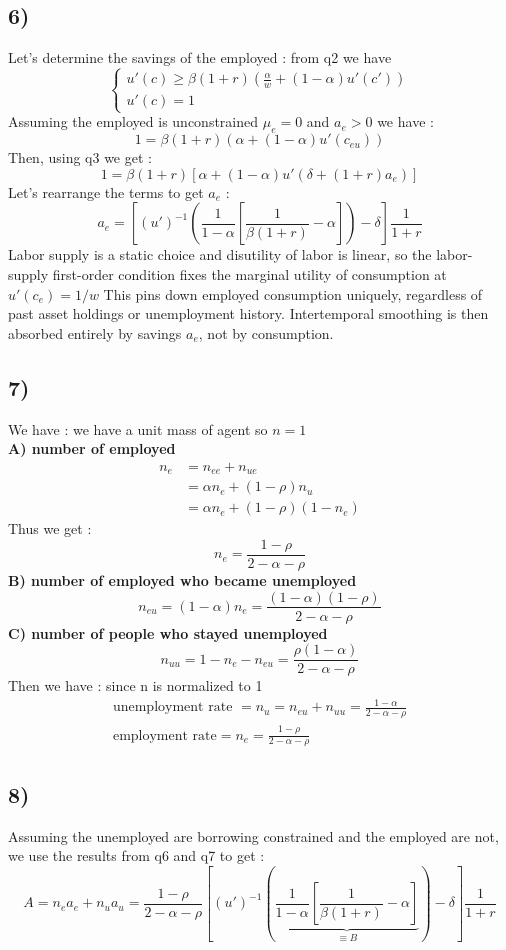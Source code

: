 \documentclass{article}
\begin{document}
\subsection*{6)}
Let's determine the savings of the employed : from q2 we have 
$$\left\{\begin{aligned}
    u'(c) \geq \beta (1+r)(\frac{\alpha}{w}+(1-\alpha)u'(c'))\\
    u'(c) = 1
\end{aligned} \right.$$
Assuming the employed is unconstrained $\mu_e=0$ and $a_e>0$ we have : 
$$1=\beta (1+r)(\alpha +(1-\alpha)u'(c_{eu}))$$
Then, using q3 we get : 
$$1=\beta (1+r)[\alpha +(1-\alpha)u'(\delta +(1+r)a_e)]$$
Let's rearrange the terms to get $a_e$ :
$$a_e = [(u')^{-1}(\frac{1}{1-\alpha}[\frac{1}{\beta(1+r)}-\alpha])-\delta]\frac{1}{1+r}$$
Labor supply is a static choice and disutility of labor is linear, so the labor-supply first-order condition fixes the marginal utility of consumption at $u'(c_e)=1/w$
This pins down employed consumption uniquely, regardless of past asset holdings or unemployment history.
Intertemporal smoothing is then absorbed entirely by savings $a_e$, not by consumption.

\subsection*{7)}
We have : we have a unit mass of agent so $n=1$\\
\textbf{A) number of employed}
$$\begin{aligned}n_e &= n_{ee}+n_{ue}\\
& = \alpha n_e + (1-\rho)n_u \\
&= \alpha n_e + (1-\rho)(1-n_e)
\end{aligned}$$
Thus we get : 
$$n_e = \frac{1-\rho}{2-\alpha-\rho}$$
\textbf{B) number of employed who became unemployed}
$$n_{eu}= (1-\alpha)n_e= \frac{(1-\alpha)(1-\rho)}{2-\alpha-\rho}$$
\textbf{C) number of people who stayed unemployed}
$$n_{uu}=1-n_e-n_{eu}=\frac{\rho(1-\alpha)}{2-\alpha-\rho}$$
Then we have : since n is normalized to 1
$$\begin{aligned}
    \text{unemployment rate } = n_u = n_{eu}+n_{uu}= \frac{1-\alpha}{2-\alpha -\rho}\\
    \text{employment rate}= n_e = \frac{1-\rho}{2-\alpha-\rho}
\end{aligned}$$

\subsection*{8)}
Assuming the unemployed are borrowing constrained and the employed are not, we use the results from q6 and q7 to get :
$$A = n_ea_e+n_ua_u=\frac{1-\rho}{2-\alpha-\rho}[(u')^{-1}(\underbrace{\frac{1}{1-\alpha}[\frac{1}{\beta(1+r)}-\alpha]}_{\equiv B})-\delta]\frac{1}{1+r}$$
\end{document}
